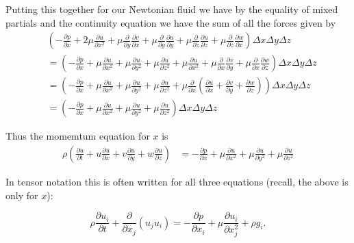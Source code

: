 \documentclass[12pt]{report}
\begin{document}
Putting this together for our Newtonian fluid we have by the equality of mixed partials and the continuity equation we have the sum of all the forces given by
\begin{align*} & \left (-\frac{\partial p}{\partial x} + 2 \mu \frac{\partial u}{\partial x^2} + \mu \frac{\partial}{\partial y} \frac{\partial v}{\partial x} + \mu \frac{\partial }{\partial y} \frac{\partial u}{\partial y} + \mu \frac{\partial }{\partial z} \frac{\partial u}{\partial z} + \mu \frac{\partial }{\partial z} \frac{\partial w}{\partial x}\right ) \Delta x \Delta y \Delta z\\
& = \left ( -\frac{\partial p}{\partial x} + \mu \frac{\partial u}{\partial x^2} + \mu\frac{\partial u}{\partial y^2} + \mu \frac{\partial u}{\partial z^2}  + \mu \frac{\partial u}{\partial x^2} + \mu \frac{\partial}{\partial x} \frac{\partial v}{\partial y} + \mu \frac{\partial }{\partial x} \frac{\partial w}{\partial z} \right ) \Delta x \Delta y \Delta z\\
& = \left (-\frac{\partial p}{\partial x} + \mu \frac{\partial u}{\partial x^2} + \mu\frac{\partial u}{\partial y^2} + \mu \frac{\partial u}{\partial z^2}  + \mu \frac{\partial }{\partial x}\left ( \frac{\partial u}{\partial x} + \frac{\partial v}{\partial y} + \frac{\partial w}{\partial z} \right ) \right ) \Delta x \Delta y \Delta z\\
& = \left ( -\frac{\partial p}{\partial x} + \mu \frac{\partial u}{\partial x^2} + \mu\frac{\partial u}{\partial y^2} + \mu \frac{\partial u}{\partial z^2}\right ) \Delta x \Delta y \Delta z\end{align*}

Thus the momemtum equation for $x$ is
\begin{align}  \rho \left ( \frac{\partial u }{\partial t} + u \frac{\partial u }{\partial x} + v \frac{\partial u}{\partial y} + w \frac{\partial u}{\partial z} \right ) &= -\frac{\partial p}{\partial x} + \mu \frac{\partial u}{\partial x^2} + \mu\frac{\partial u}{\partial y^2} + \mu \frac{\partial u}{\partial z^2}\end{align}

In tensor notation this is often written for all three equations (recall, the above is only for $x$):

\begin{equation} \rho \frac{\partial u_i}{\partial t} + \frac{\partial}{\partial x_j} \left( u_j u_i \right) = -\frac{\partial p}{\partial x_i}  + \mu \frac{\partial u_i}{\partial x_j^2}  + \rho g_i . \end{equation}
\end{document}
